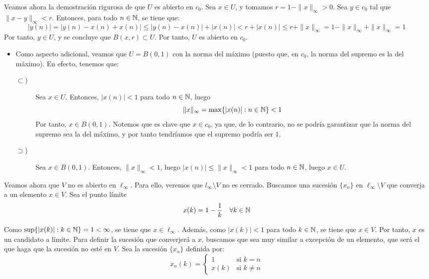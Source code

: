 \begin{ejercicio}
Veamos ahora la demostración rigurosa de que $U$ es abierto en $c_0$. Sea $x \in U$, y tomamos $r = 1 - \|x\|_\infty > 0$. Sea $y \in c_0$ tal que $\|x-y\|_\infty < r$. Entonces, para todo $n \in \mathbb{N}$, se tiene que:
\begin{equation*}
    |y(n)| = |y(n) - x(n) + x(n)| \leq |y(n) - x(n)| + |x(n)| < r + |x(n)| \leq r + \|x\|_\infty = 1-\|x\|_\infty + \|x\|_\infty = 1
\end{equation*}
Por tanto, $y \in U$, y se concluye que $B(x, r) \subset U$. Por tanto, $U$ es abierto en $c_0$.
\begin{itemize}
    \item Como aspecto adicional, veamos que $U=B(0, 1)$ con la norma del máximo (puesto que, en $c_0$, la norma del supremo es la del máximo). En efecto, tenemos que:
    \begin{description}
        \item[$\subset$)] Sea $x \in U$. Entonces, $|x(n)| < 1$ para todo $n \in \mathbb{N}$, luego $$\|x\|_\infty = \max\{|x(n)| : n \in \mathbb{N}\} < 1$$
        Por tanto, $x \in B(0, 1)$. Notemos que es clave que $x \in c_0$, ya que, de lo contrario, no se podría garantizar que la norma del supremo sea la del máximo, y por tanto tendríamos que el supremo podría ser $1$.
        \item[$\supset$)] Sea $x \in B(0, 1)$. Entonces, $\|x\|_\infty < 1$, luego $|x(n)| \leq \|x\|_\infty < 1$ para todo $n \in \mathbb{N}$, luego $x \in U$.
    \end{description}
\end{itemize}

Veamos ahora que $V$ no es abierto en $\ell_\infty$. Para ello, veremos que $l_\infty \setminus V$ no es cerrado. Buscamos una sucesión $\{x_n\}$ en $\ell_\infty \setminus V$ que converja a un elemento $x\in V$. Sea el punto límite
\begin{equation*}
    x(k) = 1-\frac{1}{k} \quad \forall k \in \mathbb{N}
\end{equation*}

Como $\sup\{|x(k)| : k \in \mathbb{N}\} = 1< \infty$, se tiene que $x \in \ell_\infty$. Además, como $|x(k)| < 1$ para todo $k \in \mathbb{N}$, se tiene que $x \in V$. Por tanto, $x$ es un candidato a límite. Para definir la sucesión que converjerá a $x$, buscamos que sea muy similar a excepción de un elemento, que será el que haga que la sucesión no esté en $V$. Sea la sucesión $\{x_n\}$ definida por:
\begin{equation*}
    x_n(k) = \begin{cases}
        1 & \text{si } k = n\\
        x(k) & \text{si } k \neq n
    \end{cases}
\end{equation*}


\end{ejercicio}
